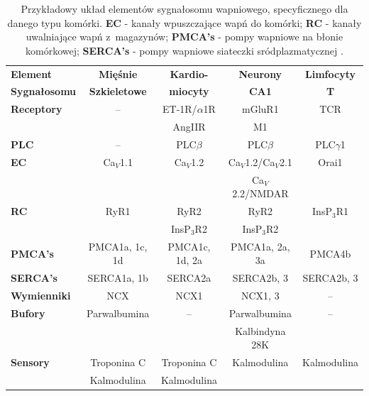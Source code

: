 \newcommand{\ngray}{\rowcolor[gray]{.90}}
\begin{table}[h!]
\small
\centering
\begin{tabular}{lcccc} \toprule[0.12em]
 \textbf{Element}     & \textbf{Mięśnie}   & \textbf{Kardio-} & \textbf{Neurony}  & \textbf{Limfocyty} \\
 \textbf{Sygnałosomu}   & \textbf{Szkieletowe} & \textbf{miocyty} & \textbf{CA1}    &  \textbf{T}    \\\midrule[0.06em]
\textbf{Receptory}    &   --       & ET-1R/$\alpha$1R & mGluR1       & TCR        \\[0.3em]
             &           & AngIIR      & M1         &          \\[0.3em]
\textbf{PLC}       & --         & PLC$\beta$    & PLC$\beta$     & PLC$\gamma$1    \\[0.3em]
\textbf{EC}        & Ca$_V$1.1      & Ca$_V$1.2    & Ca$_V$1.2/Ca$_V$2.1& Orai1       \\[0.3em]
             &           &         & Ca$_V$2.2/NMDAR  &          \\[0.3em]
\textbf{RC}        & RyR1         & RyR2       & RyR2        & InsP$_3$R1     \\[0.3em]
             &           & InsP$_3$R2    & InsP$_3$R2     &          \\[0.3em]
\textbf{PMCA's}      & PMCA1a, 1c, 1d    & PMCA1c, 1d, 2a  & PMCA1a, 2a, 3a   & PMCA4b       \\[0.3em]
\textbf{SERCA's}     & SERCA1a, 1b     & SERCA2a     & SERCA2b, 3     & SERCA2b, 3     \\[0.3em]
\textbf{Wymienniki}    & NCX         & NCX1       & NCX1, 3      & --         \\[0.3em]
\textbf{Bufory}      & Parwalbumina     &   --      & Parwalbumina    &--         \\[0.3em]
             &           &         & Kalbindyna 28K   &          \\[0.3em]
\textbf{Sensory}     & Troponina C     & Troponina C   & Kalmodulina    & Kalmodulina    \\[0.3em]
             & Kalmodulina     & Kalmodulina   &          &          \\\bottomrule[0.12em]
\end{tabular}
\caption[Przykładowy sygnałosom]{Przykładowy układ elementów sygnałosomu wapniowego, specyficznego dla danego typu komórki. \textbf{EC} - kanały wpuszczające wapń do komórki; \textbf{RC} - kanały uwalniające wapń z~magazynów; \textbf{PMCA's} - pompy wapniowe na błonie komórkowej; \textbf{SERCA's} - pompy wapniowe siateczki sródplazmatycznej \cite{Berridge2012a}.}
\label{tab:sygnalosom}
\end{table}

